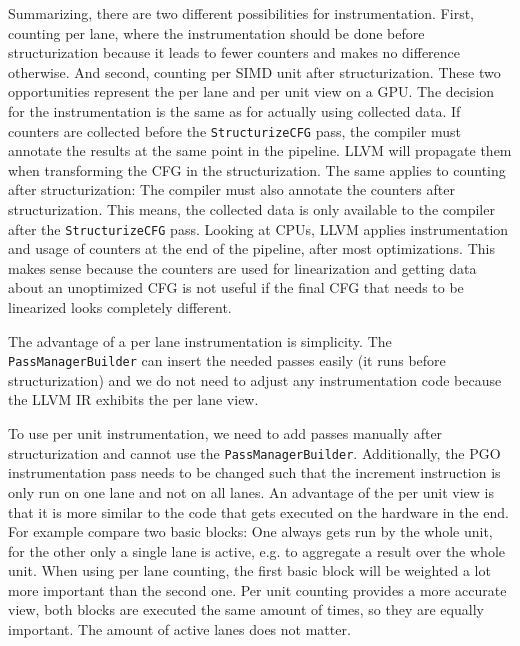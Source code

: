 Summarizing, there are two different possibilities for instrumentation. First, counting per lane, where the instrumentation should be done before structurization because it leads to fewer counters and makes no difference otherwise.
And second, counting per SIMD unit after structurization.
These two opportunities represent the per lane and per unit view on a GPU.
The decision for the instrumentation is the same as for actually using collected data. If counters are collected before the \texttt{StructurizeCFG} pass, the compiler must annotate the results at the same point in the pipeline.
LLVM will propagate them when transforming the CFG in the structurization.
The same applies to counting after structurization: The compiler must also annotate the counters after structurization.
This means, the collected data is only available to the compiler after the \texttt{StructurizeCFG} pass.
Looking at CPUs, LLVM applies instrumentation and usage of counters at the end of the pipeline, after most optimizations.
This makes sense because the counters are used for linearization and getting data about an unoptimized CFG is not useful if the final CFG that needs to be linearized looks completely different.

The advantage of a per lane instrumentation is simplicity. The \texttt{PassManagerBuilder} can insert the needed passes easily (it runs before structurization) and we do not need to adjust any instrumentation code because the LLVM IR exhibits the per lane view.

To use per unit instrumentation, we need to add passes manually after structurization and cannot use the \texttt{PassManagerBuilder}.
Additionally, the PGO instrumentation pass needs to be changed such that the increment instruction is only run on one lane and not on all lanes.
An advantage of the per unit view is that it is more similar to the code that gets executed on the hardware in the end.
For example compare two basic blocks: One always gets run by the whole unit, for the other only a single lane is active, e.g. to aggregate a result over the whole unit.
When using per lane counting, the first basic block will be weighted a lot more important than the second one.
Per unit counting provides a more accurate view, both blocks are executed the same amount of times, so they are equally important. The amount of active lanes does not matter.

